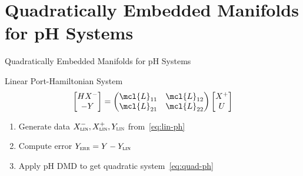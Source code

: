 \section{Quadratically Embedded Manifolds for pH Systems}

\begin{frame}{Quadratically Embedded Manifolds for pH Systems}
    \begin{block}{Linear Port-Hamiltonian System}
        \begin{equation}\label{eq:lin-ph}
            \begin{bmatrix}
                H X^- \\
                - Y
            \end{bmatrix} = \begin{pmatrix}
                \mcl{L}_{11} & \mcl{L}_{12} \\
                \mcl{L}_{21} & \mcl{L}_{22}
            \end{pmatrix} \begin{bmatrix}
                X^+ \\
                U
            \end{bmatrix}
        \end{equation}
    \end{block}

    \begin{enumerate}
        \item<2-> Generate data $X^-_{\textsc{lin}}, X^+_{\textsc{lin}}, Y_{\textsc{lin}}$ from~\eqref{eq:lin-ph}
        \item<3-> Compute error $Y_{\textsc{err}} = Y - Y_{\textsc{lin}}$
        \item<4-> Apply pH DMD to get quadratic system~\eqref{eq:quad-ph}
    \end{enumerate}

\end{frame}

